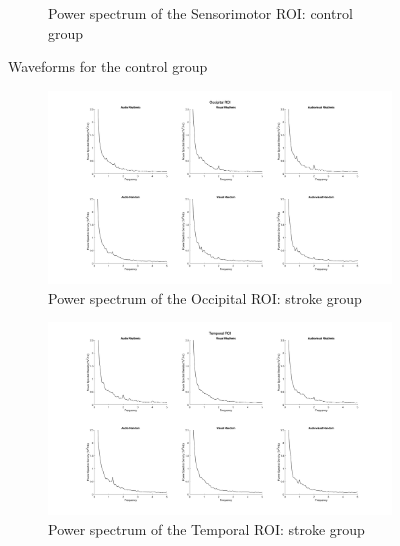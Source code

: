 \begin{figure}[htbp]
\begin{subfigure}[htbp]{0.45\textwidth}
        \caption{Power spectrum of the Sensorimotor ROI: control group}
        \label{fig: Waveforms control: sensorimotor}   
    \end{subfigure}
    \caption{Waveforms for the control group}
    \label{fig: Waveforms control}
\end{figure} 

\begin{figure}[htbp]
    \begin{subfigure}[htbp]{0.55\textwidth}
        \includegraphics[width=\textwidth]{stroke_images/occipital_roi.png}
        \caption{Power spectrum of the Occipital ROI: stroke group}
        \label{fig: Waveforms stroke: occipital} 
    \end{subfigure}  
    \hfill
    \begin{subfigure}[htbp]{0.55\textwidth}
        \includegraphics[width=\textwidth]{stroke_images/temporal_roi.png}
        \caption{Power spectrum of the Temporal ROI: stroke group}
        \label{fig: Waveforms stroke: temporal}   
    \end{subfigure}
    \vfill
    \begin{subfigure}[htbp]{0.55\textwidth}

\end{subfigure}
\end{figure}
